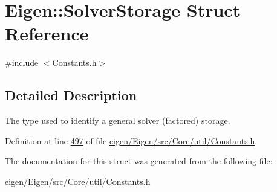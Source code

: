 \hypertarget{struct_eigen_1_1_solver_storage}{}\section{Eigen\+:\+:Solver\+Storage Struct Reference}
\label{struct_eigen_1_1_solver_storage}


{\ttfamily \#include $<$Constants.\+h$>$}



\subsection{Detailed Description}
The type used to identify a general solver (factored) storage. 

Definition at line \hyperlink{eigen_2_eigen_2src_2_core_2util_2_constants_8h_source_l00497}{497} of file \hyperlink{eigen_2_eigen_2src_2_core_2util_2_constants_8h_source}{eigen/\+Eigen/src/\+Core/util/\+Constants.\+h}.



The documentation for this struct was generated from the following file\+:\begin{DoxyCompactItemize}
\item 
eigen/\+Eigen/src/\+Core/util/\+Constants.\+h\end{DoxyCompactItemize}
